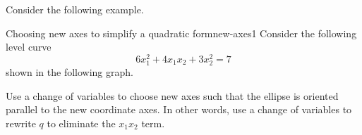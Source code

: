 Consider the following example. 

\begin{example}{Choosing new axes to simplify a quadratic form}{new-axes1}
Consider the following level curve
\[
6x_1^2 + 4x_1x_2 + 3x_2^2 = 7
\]
shown in the following graph. 
\begin{center}
\end{center}

Use a change of variables to choose new axes such that the ellipse is oriented parallel to the new coordinate axes. In other words, use a change of variables to rewrite $q$ to eliminate the $x_1x_2$ term. 
\end{example}

